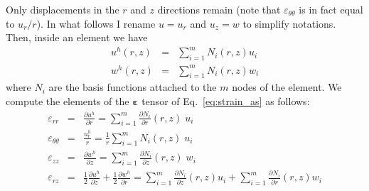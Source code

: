 Only displacements in the $r$ and $z$ directions remain (note that $\varepsilon_{\theta\theta}$ is in fact equal to $u_r/r$). In what follows I rename $u=u_r$ and $u_z=w$ to simplify notations. 
Then, inside an element we have 
\begin{eqnarray}
u^h(r,z) &=& \sum_{i=1}^m N_i(r,z) u_i \nonumber\\
w^h(r,z) &=& \sum_{i=1}^m N_i(r,z) w_i
\end{eqnarray}
where $N_i$ are the basis functions attached 
to the $m$ nodes of the element.
We compute the elements of the ${\bm \varepsilon}$ tensor of Eq.~\eqref{eq:strain_as} as follows:
\begin{eqnarray}
\varepsilon_{rr} &=&
\frac{\partial u^h}{\partial r} 
= \sum_{i=1}^m \frac{\partial N_i}{\partial r}(r,z) \; u_i \\
\varepsilon_{\theta\theta} &=& \frac{u_r^h}{r} = 
\frac{1}{r}\sum_{i=1}^m N_i(r,z) \;  u_i \\
\varepsilon_{zz} &=& 
\frac{\partial w^h}{\partial z}
= \sum_{i=1}^m \frac{\partial N_i}{\partial z}(r,z) \; w_i \\
\varepsilon_{rz} &=& \frac12\frac{\partial u^h}{\partial z}
+\frac12 \frac{\partial w^h}{\partial r}
= \sum_{i=1}^m \frac{\partial N_i}{\partial z}(r,z) u_i 
+ \sum_{i=1}^m \frac{\partial N_i}{\partial r}(r,z) w_i 
\end{eqnarray}

